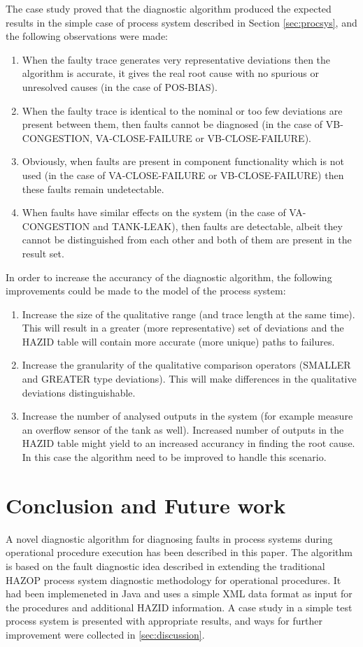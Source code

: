 \documentclass[conference]{IEEEtran}
\begin{document}
The case study proved that the diagnostic algorithm produced the expected results in the simple case of process system described in Section \ref{sec:procsys}, and the following observations were made:

\begin{enumerate}
\item When the faulty trace generates very representative deviations then the algorithm is accurate, it gives the real root cause with no spurious or unresolved causes (in the case of POS-BIAS).
\item When the faulty trace is identical to the nominal or too few deviations are present between them, then faults cannot be diagnosed (in the case of VB-CONGESTION, VA-CLOSE-FAILURE or VB-CLOSE-FAILURE).
\item Obviously, when faults are present in component functionality which is not used (in the case of VA-CLOSE-FAILURE or VB-CLOSE-FAILURE) then these faults remain undetectable.
\item When faults have similar effects on the system (in the case of VA-CONGESTION and TANK-LEAK), then faults are detectable, albeit they cannot be distinguished from each other and both of them are present in the result set.
\end{enumerate}

In order to increase the accurancy of the diagnostic algorithm, the following improvements could be made to the model of the process system:
\begin{enumerate}
\item Increase the size of the qualitative range (and trace length at the same time). This will result in a greater (more representative) set of deviations and the HAZID table will contain more accurate (more unique) paths to failures.
\item Increase the granularity of the qualitative comparison operators (SMALLER and GREATER type deviations). This will make differences in the qualitative deviations distinguishable.
\item Increase the number of analysed outputs in the system (for example measure an overflow sensor of the tank as well). Increased number of outputs in the HAZID table might yield to an increased accurancy in finding the root cause. In this case the algorithm need to be improved to handle this scenario.
\end{enumerate}

\section {Conclusion and Future work}
A novel diagnostic algorithm for diagnosing faults in process systems during operational procedure execution has been described in this paper. The algorithm is based on the fault diagnostic idea described in \cite{KES2011} extending the traditional HAZOP process system diagnostic methodology for operational procedures. It had been implemeneted in Java and uses a simple XML data format as input for the procedures and additional HAZID information. A case study in a simple test process system is presented with appropriate results, and ways for further improvement were collected in \ref{sec:discussion}.
\end{document}
